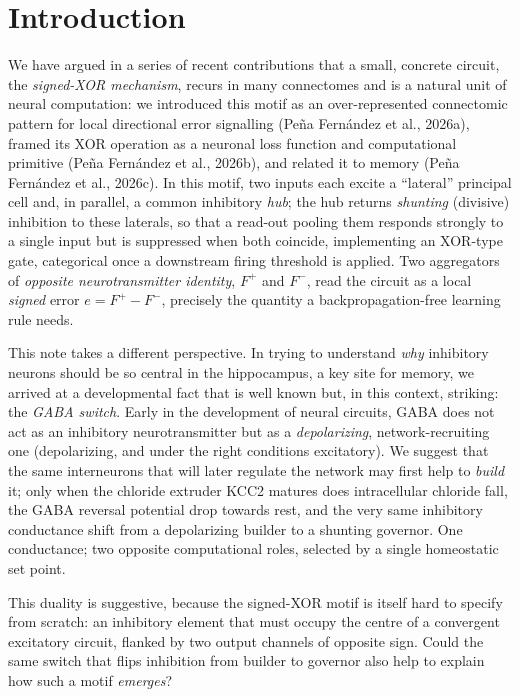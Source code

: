 \documentclass[11pt,a4paper]{article}
\begin{document}
\section{Introduction}\label{sec:intro}

We have argued in a series of recent contributions that a small, concrete circuit, the \emph{signed-XOR mechanism}, recurs in many connectomes and is a natural unit of neural computation: we introduced this motif as an over-represented connectomic pattern for local directional error signalling (Pe\~na Fern\'andez et al., 2026a), framed its XOR operation as a neuronal loss function and computational primitive (Pe\~na Fern\'andez et al., 2026b), and related it to memory (Pe\~na Fern\'andez et al., 2026c). In this motif, two inputs each excite a ``lateral'' principal cell and, in parallel, a common inhibitory \emph{hub}; the hub returns \emph{shunting} (divisive) inhibition to these laterals, so that a read-out pooling them responds strongly to a single input but is suppressed when both coincide, implementing an XOR-type gate, categorical once a downstream firing threshold is applied. Two aggregators of \emph{opposite neurotransmitter identity}, $F^{+}$ and $F^{-}$, read the circuit as a local \emph{signed} error $e=F^{+}-F^{-}$, precisely the quantity a backpropagation-free learning rule needs.  

This note takes a different perspective. In trying to understand \emph{why} inhibitory neurons should be so central in the hippocampus, a key site for memory, we arrived at a developmental fact that is well known but, in this context, striking: the \emph{GABA switch}. Early in the development of neural circuits, GABA does not act as an inhibitory neurotransmitter but as a \emph{depolarizing}, network-recruiting one (depolarizing, and under the right conditions excitatory). We suggest that the same interneurons that will later regulate the network may first help to \emph{build} it; only when the chloride extruder KCC2 matures does intracellular chloride fall, the GABA reversal potential drop towards rest, and the very same inhibitory conductance shift from a depolarizing builder to a shunting governor. One conductance; two opposite computational roles, selected by a single homeostatic set point.

This duality is suggestive, because the signed-XOR motif is itself hard to specify from scratch: an inhibitory element that must occupy the centre of a convergent excitatory circuit, flanked by two output channels of opposite sign. Could the same switch that flips inhibition from builder to governor also help to explain how such a motif \emph{emerges}? 
\end{document}

